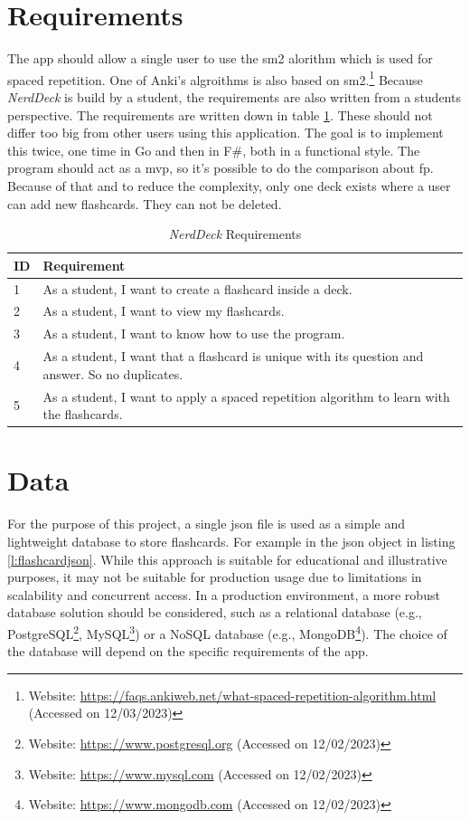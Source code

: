    \section{Requirements}
     The \ac{app} should allow a single user to use the \ac{sm2} alorithm which is used for spaced repetition.\cite{sm2} One of Anki's algroithms is also based on \ac{sm2}.\footnote{Website: \url{https://faqs.ankiweb.net/what-spaced-repetition-algorithm.html} (Accessed on 12/03/2023)} Because \textit{NerdDeck} is build by a student, the requirements are also written from a students perspective. The requirements are written down in table \ref{tab:requirements}. These should not differ too big from other users using this application. The goal is to implement this twice, one time in Go and then in F\#, both in a functional style. The program should act as a \ac{mvp}, so it's possible to do the comparison about \ac{fp}. Because of that and to reduce the complexity, only one deck exists where a user can add new flashcards. They can not be deleted.
    \begin{table}[h]
        \centering
        \begin{tabular}{|m{0.5in}|m{4in}|}
            \hline
            \textbf{ID} & \textbf{Requirement} \\
            \hline
            1 & As a student, I want to create a flashcard inside a deck. \\
            \hline
            2 & As a student, I want to view my flashcards. \\
            \hline
            3 & As a student, I want to know how to use the program. \\
            \hline
            4 & As a student, I want that a flashcard is unique with its question and answer. So no duplicates.  \\
            \hline
            5 & As a student, I want to apply a spaced repetition algorithm to learn with the flashcards. \\
            \hline
        \end{tabular}
        \caption{\textit{NerdDeck} Requirements}
        \label{tab:requirements}
    \end{table}

    \section{Data}
    For the purpose of this project, a single \ac{json} file is used as a simple and lightweight database to store flashcards. For example in the \ac{json} object in listing \ref{l:flashcardjson}. While this approach is suitable for educational and illustrative purposes, it may not be suitable for production usage due to limitations in scalability and concurrent access. In a production environment, a more robust database solution should be considered, such as a relational database (e.g., PostgreSQL\footnote{Website: \url{https://www.postgresql.org} (Accessed on 12/02/2023)}, MySQL\footnote{Website: \url{https://www.mysql.com} (Accessed on 12/02/2023)}) or a NoSQL database (e.g., MongoDB\footnote{Website: \url{https://www.mongodb.com} (Accessed on 12/02/2023)}). The choice of the database will depend on the specific requirements of the \ac{app}.

